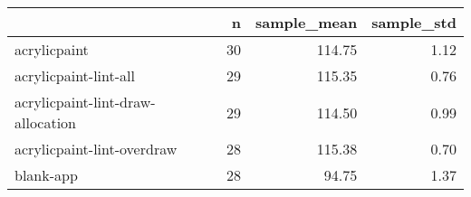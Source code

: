 \begin{tabular}{lrrr}
\toprule
{} &   n &  sample\_mean &  sample\_std \\
\midrule
acrylicpaint                      &  30 &       114.75 &        1.12 \\
acrylicpaint-lint-all             &  29 &       115.35 &        0.76 \\
acrylicpaint-lint-draw-allocation &  29 &       114.50 &        0.99 \\
acrylicpaint-lint-overdraw        &  28 &       115.38 &        0.70 \\
blank-app                         &  28 &        94.75 &        1.37 \\
\bottomrule
\end{tabular}

